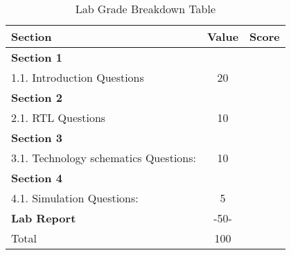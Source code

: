 \documentclass{article}
\begin{document}
\begin{table}[!htb]
  \begin{center}
    \begin{tabular}[width=0.8\textwidth]{|l|c|l|}
       \hline
       Section & Value & Score\\
       \hline 
       \multicolumn{2}{|l}{\textbf{Section 1}} &\\
       \hline
       1.1. Introduction Questions & 20 &\\
       \hline
       \multicolumn{2}{|l}{\textbf{Section 2}}  &\\
       \hline
       2.1. RTL Questions & 10 &\\
       \hline
       \multicolumn{2}{|l}{\textbf{Section 3}}  &\\
       \hline
       3.1. Technology schematics Questions: & 10 &\\
       \hline
       \multicolumn{2}{|l}{\textbf{Section 4}}  &\\
       \hline
       4.1. Simulation Questions: & 5 &\\
       \hline
       \multicolumn{1}{|l}{\textbf{Lab Report}}  & -50- &\\
       \hline
       \hline
       \multicolumn{1}{|l}{Total} & \multicolumn{1}{c|}{100} &\\
       \hline
    \end{tabular}
  \end{center}
  \caption{Lab Grade Breakdown Table}
\end{table}
\end{document}
